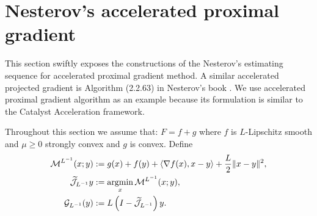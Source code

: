 \documentclass[12pt]{article}
\begin{document}
\section{Nesterov's accelerated proximal gradient}
    This section swiftly exposes the constructions of the Nesterov's estimating sequence for accelerated proximal gradient method. A similar accelerated projected gradient is Algorithm (2.2.63) in Nesterov's book \cite{nesterov_lectures_2018}. 
    We use accelerated proximal gradient algorithm as an example because its formulation is similar to the Catalyst Acceleration framework. 

    Throughout this section we assume that: $F = f + g$ where $f$ is $L$-Lipschitz smooth and $\mu \ge 0$ strongly convex and $g$ is convex. 
    Define 
    \begin{align*}
        \mathcal M^{L^{-1}}(x; y) 
        &:= g(x) + f(y) 
        + 
        \left\langle \nabla f(x), x - y\right\rangle 
        + 
        \frac{L}{2}\Vert x - y\Vert^2, 
        \\
        \widetilde{\mathcal J}_{L^{-1}}y 
        &:= \mathop{\rm argmin}\limits_{x} \mathcal M^{L^{-1}}(x; y), 
        \\
        \mathcal G_{L^{-1}}(y)
        &:= L\left(I - \widetilde{\mathcal J}_{L^{-1}}\right)y. 
    \end{align*}
\end{document}
